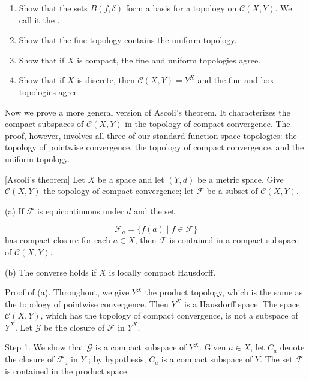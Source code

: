 \begin{enumerate}[itemsep=0.4em, parsep=0pt, topsep=0pt, partopsep=0pt, leftmargin=*, label=\arabic*., ref=\arabic*]
 \begin{enumerate}[itemsep=0.2em, parsep=0pt, topsep=0pt, partopsep=0pt, leftmargin=*, label=(\alph*), align=left]
 \item Show that the sets \(B({f,\delta })\) form a basis for a topology on \(\mathcal{C}({X,Y})\). We call it the .
 \item Show that the fine topology contains the uniform topology.
 \item Show that if \(X\) is compact, the fine and uniform topologies agree.
 \item Show that if \(X\) is discrete, then \(\mathcal{C}({X,Y}) = Y^{X}\) and the fine and box topologies agree.
 \end{enumerate}
\end{enumerate}

Now we prove a more general version of Ascoli's theorem. It characterizes the compact subspaces of \(\mathcal{C}({X,Y})\) in the topology of compact convergence. The proof, however, involves all three of our standard function space topologies: the topology of pointwise convergence, the topology of compact convergence, and the uniform topology.

\begin{theorem}
\label{thm:\thetheorem}[Ascoli's theorem]
Let \(X\) be a space and let \((Y, d)\) be a metric space. Give \(\mathcal{C}({X,Y})\) the topology of compact convergence; let \(\mathcal{F}\) be a subset of \(\mathcal{C}({X,Y})\).

(a) If \(\mathcal{F}\) is equicontinuous under \(d\) and the set

\[
\mathcal{F}_{a} = \{ f( a) \mid f \in \mathcal{F}\}
\]
has compact closure for each \(a \in X\), then \(\mathcal{F}\) is contained in a compact subspace of \(\mathcal{C}({X,Y})\).

(b) The converse holds if \(X\) is locally compact Hausdorff.
\end{theorem}

Proof of (a). Throughout, we give \(Y^{X}\) the product topology, which is the same as the topology of pointwise convergence. Then \(Y^{X}\) is a Hausdorff space. The space \(\mathcal{C}({X,Y})\), which has the topology of compact convergence, is not a subspace of \(Y^{X}\). Let \(\mathcal{G}\) be the closure of \(\mathcal{F}\) in \(Y^{X}\).

Step 1. We show that \(\mathcal{G}\) is a compact subspace of \(Y^{X}\). Given \(a \in X\), let \(C_{a}\) denote the closure of \(\mathcal{F}_{a}\) in \(Y\) ; by hypothesis, \(C_{a}\) is a compact subspace of \(Y\). The set \(\mathcal{F}\) is contained in the product space

